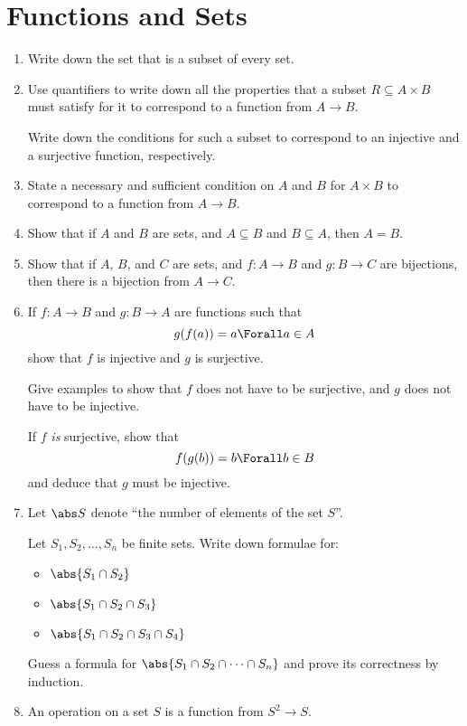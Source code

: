 \section{Functions and Sets}

\begin{enumerate}
 \item
  Write down the set that is a subset of every set.
 \item
  Use quantifiers to write down all the properties that a subset
  \(R \subseteq A \times B\) must satisfy for it to correspond to a function
  from \(A \to B\).

  Write down the conditions for such a subset to correspond to an injective and
  a surjective function, respectively.
 \item
  State a necessary and sufficient condition on \(A\) and \(B\) for
  \(A \times B\) to correspond to a function from \(A \to B\).
 \item
  Show that if \(A\) and \(B\) are sets, and \(A \subseteq B\) and
  \(B \subseteq A\), then \(A = B\).
 \item
  Show that if \(A\), \(B\), and \(C\) are sets, and
  \(f : A \to B\) and \(g : B \to C\) are bijections, then there is a bijection
  from \(A \to C\).
 \item
  If \(f: A \to B\) and \(g: B \to A\) are functions such that
  \begin{equation*}
   g(f(a)) = a \Forall a \in A
  \end{equation*}
  show that \(f\) is injective and \(g\) is surjective.

  Give examples to show that \(f\) does not have to be surjective, and \(g\)
  does not have to be injective.

  If \(f\) \emph{is} surjective, show that
  \begin{equation*}
   f(g(b)) = b \Forall b \in B
  \end{equation*}
  and deduce that \(g\) must be injective.
 \item
  Let \(\abs S\) denote ``the number of elements of the set \(S\)''.

  Let \(S_1, S_2, \dotsc, S_n\) be finite sets. Write down formulae for:
  \begin{itemize}
   \item
    \(\abs{S_1 \cap S_2}\)
   \item
    \(\abs{S_1 \cap S_2 \cap S_3}\)
   \item
    \(\abs{S_1 \cap S_2 \cap S_3 \cap S_4}\)
  \end{itemize}
  Guess a formula for \(\abs{S_1 \cap S_2 \cap \dotsb \cap S_n}\) and prove its
  correctness by induction.
 \item
  An operation on a set \(S\) is a function from \(S^2 \to S\).


\end{enumerate}
